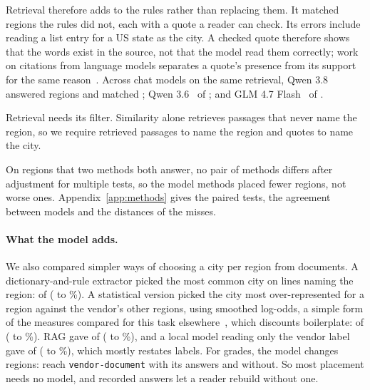 \documentclass[10pt,twocolumn]{article}
\newcommand{\code}[1]{\texttt{#1}}
\begin{document}
Retrieval therefore adds to the rules rather than replacing them. It matched \llmRagRescued{} regions the rules did not, each with a quote a reader can check. Its errors include reading a list entry for a US state as the city. A checked quote therefore shows that the words exist in the source, not that the model read them correctly; work on citations from language models separates a quote's presence from its support for the same reason~\citep{gao2023enabling}. Across chat models on the same retrieval, Qwen 3.8 answered \extractRagAnswered{} regions and matched \extractRagMatched{}; Qwen 3.6~\citep{hf_qwen36} \extractRagQwenSixMatched{} of \extractRagQwenSixAnswered{}; and GLM 4.7 Flash~\citep{hf_glm47flash,glm2025glm45} \extractRagGlmMatched{} of \extractRagGlmAnswered{}.

Retrieval needs its filter. Similarity alone retrieves passages that never name the region, so we require retrieved passages to name the region and quotes to name the city.

On regions that two methods both answer, no pair of methods differs after adjustment for multiple tests, so the model methods placed fewer regions, not worse ones. Appendix~\ref{app:methods} gives the paired tests, the agreement between models and the distances of the misses.

\paragraph{What the model adds.} We also compared simpler ways of choosing a city per region from documents. A dictionary-and-rule extractor picked the most common city on lines naming the region: \extractTraditionalMatched{} of \extractTraditionalAnswered{} (\extractTraditionalLow{} to \extractTraditionalHigh{}\%). A statistical version picked the city most over-represented for a region against the vendor's other regions, using smoothed log-odds, a simple form of the measures compared for this task elsewhere~\citep{monroe2008fightin}, which discounts boilerplate: \extractStatisticalMatched{} of \extractStatisticalAnswered{} (\extractStatisticalLow{} to \extractStatisticalHigh{}\%). RAG gave \extractRagMatched{} of \extractRagAnswered{} (\extractRagLow{} to \extractRagHigh{}\%), and a local model reading only the vendor label gave \extractLabelMatched{} of \extractLabelAnswered{} (\extractLabelLow{} to \extractLabelHigh{}\%), which mostly restates labels. For grades, the model changes \modelGainRegions{} regions: \vendorDocWithModel{} reach \code{vendor-document} with its answers and \vendorDocWithoutModel{} without. So most placement needs no model, and recorded answers let a reader rebuild without one.
\end{document}
